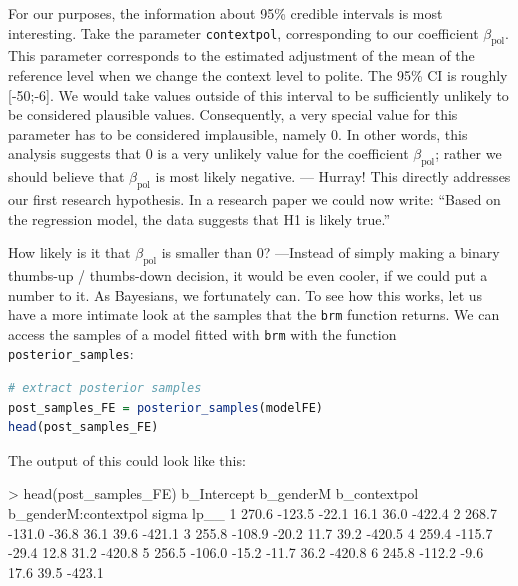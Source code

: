 \documentclass[nobib]{tufte-handout}
\begin{document}
For our purposes, the information about 95\% credible intervals is most interesting. Take the parameter \texttt{contextpol}, corresponding to our coefficient $\beta_{\text{pol}}$. This parameter corresponds to the estimated adjustment of the mean of the reference level when we change the context level to polite. The 95\% CI is roughly [-50;-6]. We would take values outside of this interval to be sufficiently unlikely to be considered plausible values. Consequently, a very special value for this parameter has to be considered implausible, namely 0. In other words, this analysis suggests that 0 is a very unlikely value for the coefficient $\beta_{\text{pol}}$; rather we should believe that $\beta_{\text{pol}}$ is most likely negative. --- Hurray! This directly addresses our first research hypothesis. In a research paper we could now write: ``Based on the regression model, the data suggests that H1 is likely true.''

How likely is it that $\beta_{\text{pol}}$ is smaller than 0? ---Instead of simply making a binary thumbs-up / thumbs-down decision, it would be even cooler, if we could put a number to it. As Bayesians, we fortunately can. To see how this works, let us have a more intimate look at the samples that the \texttt{brm} function returns. We can access the samples of a model fitted with \texttt{brm} with the function \texttt{posterior\_samples}:

\bigskip

\begin{minipage}[]{\textwidth}
\begin{lstlisting}[language=R]
# extract posterior samples 
post_samples_FE = posterior_samples(modelFE)
head(post_samples_FE)
\end{lstlisting}
\end{minipage}

The output of this could look like this:

\bigskip

\begin{minipage}[]{1.2\textwidth}
\begin{rc}
> head(post_samples_FE)
  b_Intercept b_genderM b_contextpol b_genderM:contextpol sigma   lp__
1       270.6    -123.5        -22.1                 16.1  36.0 -422.4
2       268.7    -131.0        -36.8                 36.1  39.6 -421.1
3       255.8    -108.9        -20.2                 11.7  39.2 -420.5
4       259.4    -115.7        -29.4                 12.8  31.2 -420.8
5       256.5    -106.0        -15.2                -11.7  36.2 -420.8
6       245.8    -112.2         -9.6                 17.6  39.5 -423.1
\end{rc}
\end{minipage}
\end{document}
